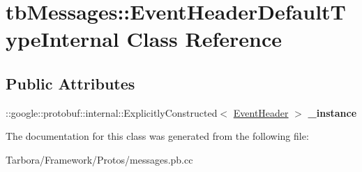 \hypertarget{classtbMessages_1_1EventHeaderDefaultTypeInternal}{}\section{tb\+Messages\+:\+:Event\+Header\+Default\+Type\+Internal Class Reference}
\label{classtbMessages_1_1EventHeaderDefaultTypeInternal}
\subsection*{Public Attributes}
\begin{DoxyCompactItemize}
\item 
\mbox{\label{classtbMessages_1_1EventHeaderDefaultTypeInternal_aa1839779dc40288fa5d55945f8da8ad8}} 
\+::google\+::protobuf\+::internal\+::\+Explicitly\+Constructed$<$ \hyperlink{classtbMessages_1_1EventHeader}{Event\+Header} $>$ {\bfseries \+\_\+instance}
\end{DoxyCompactItemize}


The documentation for this class was generated from the following file\+:\begin{DoxyCompactItemize}
\item 
Tarbora/\+Framework/\+Protos/messages.\+pb.\+cc\end{DoxyCompactItemize}
